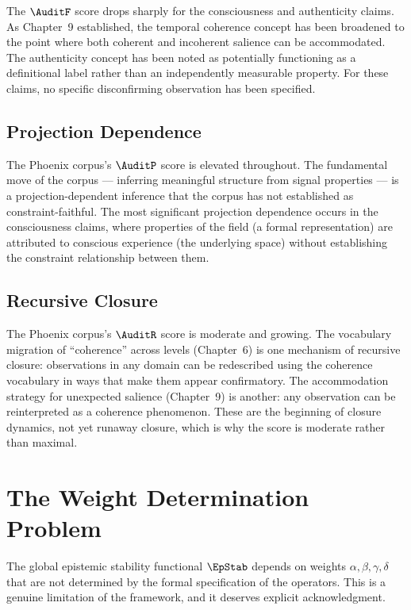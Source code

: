 The $\AuditF$ score drops sharply for the consciousness
and authenticity claims. As Chapter~9 established,
the temporal coherence concept has been broadened to
the point where both coherent and incoherent salience
can be accommodated. The authenticity concept has been
noted as potentially functioning as a definitional
label rather than an independently measurable property.
For these claims, no specific disconfirming observation
has been specified.

\subsection{Projection Dependence}

The Phoenix corpus's $\AuditP$ score is elevated
throughout. The fundamental move of the corpus ---
inferring meaningful structure from signal properties
--- is a projection-dependent inference that the corpus
has not established as constraint-faithful. The most
significant projection dependence occurs in the
consciousness claims, where properties of the \MEMeight{}
field (a formal representation) are attributed to
conscious experience (the underlying space) without
establishing the constraint relationship between them.

\subsection{Recursive Closure}

The Phoenix corpus's $\AuditR$ score is moderate and
growing. The vocabulary migration of ``coherence'' across
levels (Chapter~6) is one mechanism of recursive closure:
observations in any domain can be redescribed using
the coherence vocabulary in ways that make them appear
confirmatory. The accommodation strategy for unexpected
salience (Chapter~9) is another: any observation can
be reinterpreted as a coherence phenomenon. These are
the beginning of closure dynamics, not yet runaway
closure, which is why the score is moderate rather
than maximal.

\section{The Weight Determination Problem}
\label{sec:weight-determination}

The global epistemic stability functional $\EpStab$ depends
on weights $\alpha, \beta, \gamma, \delta$ that are not
determined by the formal specification of the operators.
This is a genuine limitation of the framework, and it
deserves explicit acknowledgment.

